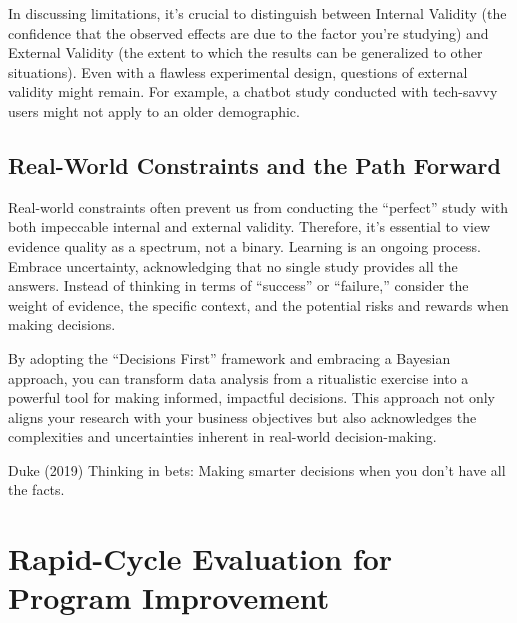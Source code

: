 \documentclass[
  letterpaper,
  DIV=11,
  numbers=noendperiod]{scrreprt}
\begin{document}
In discussing limitations, it's crucial to distinguish between Internal
Validity (the confidence that the observed effects are due to the factor
you're studying) and External Validity (the extent to which the results
can be generalized to other situations). Even with a flawless
experimental design, questions of external validity might remain. For
example, a chatbot study conducted with tech-savvy users might not apply
to an older demographic.

\section{Real-World Constraints and the Path
Forward}\label{real-world-constraints-and-the-path-forward}

Real-world constraints often prevent us from conducting the ``perfect''
study with both impeccable internal and external validity. Therefore,
it's essential to view evidence quality as a spectrum, not a binary.
Learning is an ongoing process. Embrace uncertainty, acknowledging that
no single study provides all the answers. Instead of thinking in terms
of ``success'' or ``failure,'' consider the weight of evidence, the
specific context, and the potential risks and rewards when making
decisions.

By adopting the ``Decisions First'' framework and embracing a Bayesian
approach, you can transform data analysis from a ritualistic exercise
into a powerful tool for making informed, impactful decisions. This
approach not only aligns your research with your business objectives but
also acknowledges the complexities and uncertainties inherent in
real-world decision-making.

\begin{tcolorbox}[enhanced jigsaw, colframe=quarto-callout-tip-color-frame, left=2mm, toprule=.15mm, colbacktitle=quarto-callout-tip-color!10!white, title=\textcolor{quarto-callout-tip-color}{\faLightbulb}\hspace{0.5em}{Learn more}, coltitle=black, rightrule=.15mm, leftrule=.75mm, colback=white, arc=.35mm, bottomtitle=1mm, bottomrule=.15mm, breakable, titlerule=0mm, opacitybacktitle=0.6, toptitle=1mm, opacityback=0]

Duke (2019) Thinking in bets: Making smarter decisions when you don't
have all the facts.

\end{tcolorbox}

\chapter{Rapid-Cycle Evaluation for Program
Improvement}\label{rapid-cycle-evaluation-for-program-improvement}
\end{document}
